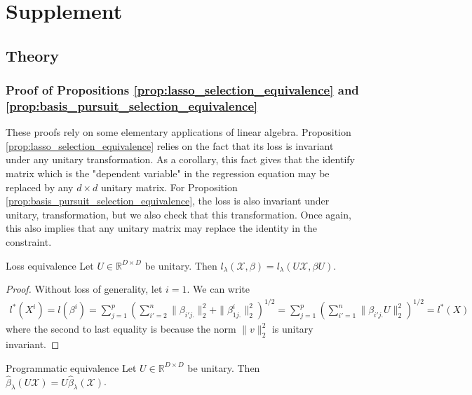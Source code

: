 \section{Supplement}

\subsection{Theory}

\subsubsection{Proof of Propositions \ref{prop:lasso_selection_equivalence} and \ref{prop:basis_pursuit_selection_equivalence} }

These proofs rely on some elementary applications of linear algebra.
Proposition \ref{prop:lasso_selection_equivalence} relies on the fact that its loss is invariant under any unitary transformation.
As a corollary, this fact gives that the identify matrix which is the "dependent variable" in the regression equation may be replaced by any $d \times d$ unitary matrix.
For Proposition \ref{prop:basis_pursuit_selection_equivalence}, the loss is also invariant under unitary, transformation, but we also check that this transformation.
Once again, this also implies that any unitary matrix may replace the identity in the constraint.


 \begin{proposition}{Loss equivalence}
 \label{prop:lasso_loss_equivalence}
 Let $U \in \mathbb R^{D \times D}$ be unitary.
 Then $l_\lambda (\mathcal X, \beta) = l_\lambda (U \mathcal X, \beta U)$.
\end{proposition}

\begin{proof}


Without loss of generality, let $i = 1$.
We can write 
\begin{eqnarray}
l^*(X^i) = l(\beta^i) = \sum_{j = 1}^p (\sum_{i'=2}^n \| \beta_{i'j.} \|_2^2 +  \|  \beta_{1j.}^i \|_2^2 )^{1/2}=  \sum_{j = 1}^p (\sum_{i'=1}^n \| \beta_{i'j.} U \|_2^2)^{1/2} = l^*(X)
\end{eqnarray}
where the second to last equality is because the norm $\|v\|_2^2 $ is unitary invariant.

\end{proof}

\begin{proposition}{Programmatic equivalence}
\label{prop:lasso_program_equivalence}
 Let $U \in \mathbb R^{D \times D}$ be unitary.
 Then $\hat \beta_{\lambda}  (U \mathcal X) = U\hat \beta_{\lambda} (\mathcal X)$.
\end{proposition}


